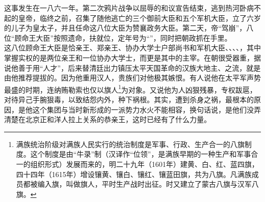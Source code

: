 这事发生在一八六一年。第二次鸦片战争以屈辱的和议宣告结束，逃到热河卧病不起的皇帝，临终之前，召集了随他逃亡的三个御前大臣和五个军机大臣，立了六岁的儿子为皇太子，并且任命这八位大臣为赞襄政务大臣。第二天，帝“驾崩”，八位“顾命王大臣”按照遗命，扶就位，定年号为“”，同时把朝政抓在手里。\\

这八位顾命王大臣是恰亲王、郑亲王、协办大学士户部尚书和军机大臣、、、、，其中掌握实权的是两位亲王和一位协办大学士，而更是其中的主宰。在朝很受器重，据说他善于用“人才”，后来替清廷出力镇压太平天国革命的汉族大地主、之流，就是由他推荐提拔的。因为他重用汉人，贵族们对他极其嫉恨。有人说他在太平军声势最盛的时期，连纳贿勒索也仅以旗人\footnote{满族统治阶级对满族人民实行的统治制度是军事、行政、生产合一的八旗制度。这个制度是由“牛录”制（汉译作“位领”，是满族早期的一种生产和军事合一的组织形式）发展而来的，明二十九年（1601年）建黄、白、红、蓝四旗，四十四年（1615年）增设镶黄、镶白、镶红、镶蓝田旗，共为八旗。凡满族成员都被编入旗，叫做旗人，平时生产战时出征。时又建立了蒙古八旗与汉军八旗。}为对象。又说他为人凶狠残暴，专权跋扈，对待异己手腕狠毒，以致结怨内外，种下祸根。其实，遭到杀身之祸，最根本的原因，是他这个集团与当时新形成的一派势力水火不能相容，换句话说，是他们没弄清楚在北京正和洋人拉上关系的恭亲王，这时已经有了什么力量。\\

